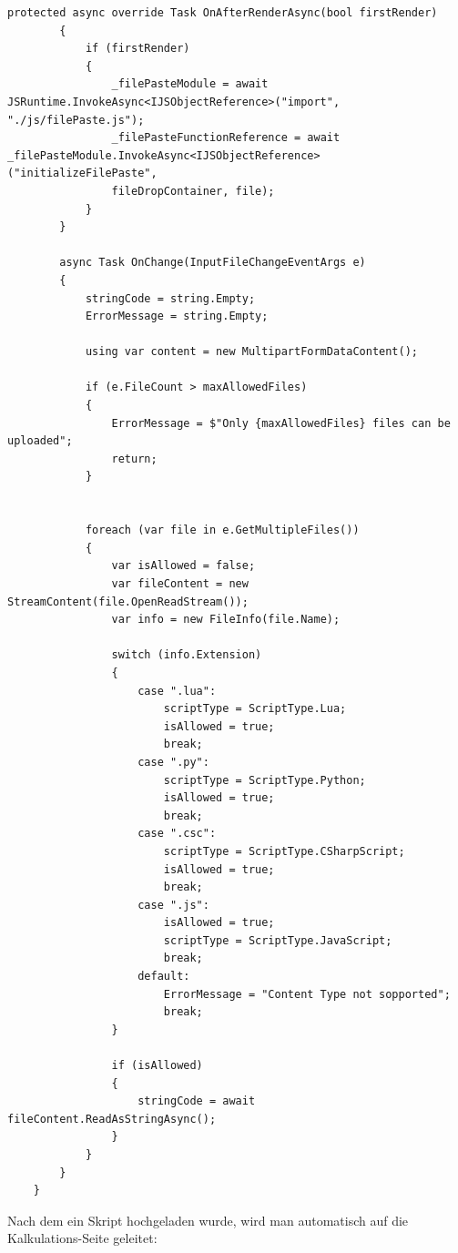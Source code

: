 \begin{lstlisting}[language={[Sharp]C}, caption=Code for FileUpload, label=lst:imp:fu]
        protected async override Task OnAfterRenderAsync(bool firstRender)
        {
            if (firstRender)
            {
                _filePasteModule = await JSRuntime.InvokeAsync<IJSObjectReference>("import", "./js/filePaste.js");
                _filePasteFunctionReference = await _filePasteModule.InvokeAsync<IJSObjectReference>("initializeFilePaste",
                fileDropContainer, file);
            }
        }
    
        async Task OnChange(InputFileChangeEventArgs e)
        {
            stringCode = string.Empty;
            ErrorMessage = string.Empty;
    
            using var content = new MultipartFormDataContent();
    
            if (e.FileCount > maxAllowedFiles)
            {
                ErrorMessage = $"Only {maxAllowedFiles} files can be uploaded";
                return;
            }
    
    
            foreach (var file in e.GetMultipleFiles())
            {
                var isAllowed = false;
                var fileContent = new StreamContent(file.OpenReadStream());
                var info = new FileInfo(file.Name);
    
                switch (info.Extension)
                {
                    case ".lua":
                        scriptType = ScriptType.Lua;
                        isAllowed = true;
                        break;
                    case ".py":
                        scriptType = ScriptType.Python;
                        isAllowed = true;
                        break;
                    case ".csc":
                        scriptType = ScriptType.CSharpScript;
                        isAllowed = true;
                        break;
                    case ".js":
                        isAllowed = true;
                        scriptType = ScriptType.JavaScript;
                        break;
                    default:
                        ErrorMessage = "Content Type not sopported";
                        break;
                }
    
                if (isAllowed)
                {
                    stringCode = await fileContent.ReadAsStringAsync();
                }
            }
        }
    }
\end{lstlisting}
\newpage
Nach dem ein Skript hochgeladen wurde, wird man automatisch auf die Kalkulations-Seite geleitet:

